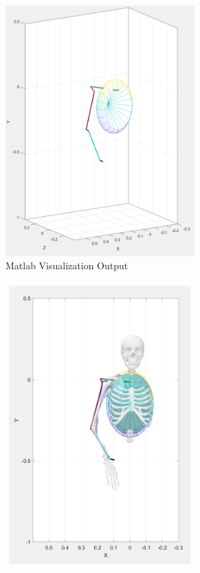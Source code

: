 \begin{figure}[h!] 
    \centering

    \begin{subfigure}[b]{0.45\linewidth}            
        \includegraphics[width=0.8\textwidth]{Pictures/DAS/das3stick.png}
        \caption{Matlab Visualization Output}
        \label{fig:das3stick}
    \end{subfigure}
    \hfill
    \begin{subfigure}[b]{0.45\linewidth}
        \includegraphics[width=0.8\textwidth]{Pictures/Results/armbackground.png}

\end{subfigure}
\end{figure}

